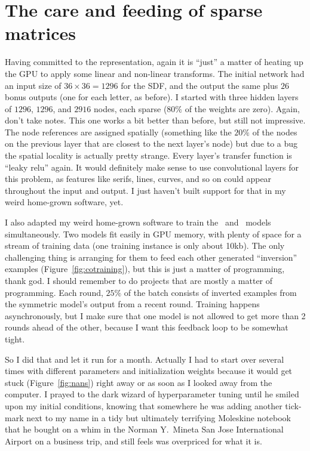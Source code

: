 \documentclass[twocolumn]{article}
\begin{document}
\section{The care and feeding of sparse matrices} \label{sec:neural}

Having committed to the representation, again it is ``just'' a matter
of heating up the GPU to apply some linear and non-linear transforms.
The initial network had an input size of $36 \times 36 = 1296$ for the
SDF, and the output the same plus $26$ bonus outputs (one for each
letter, as before). I started with three hidden layers of $1296$, $1296$,
and $2916$ nodes, each sparse ($80\%$ of the weights are zero). Again,
don't take notes. This one works a bit better than before, but still
not impressive. The node references are assigned spatially (something
like the $20\%$ of the nodes on the previous layer that are closest to
the next layer's node) but due to a bug the spatial locality is
actually pretty strange.
Every layer's transfer function is ``leaky relu'' again. It would
definitely make sense to use convolutional layers for this problem, as
features like serifs, lines, curves, and so on could appear throughout
the input and output. I just haven't built support for that in my
weird home-grown software, yet.

I also adapted my weird home-grown software to train the
\makeuppercase\ and \makelowercase\ models simultaneously. Two models
fit easily in GPU memory, with plenty of space for a stream of
training data (one training instance is only about 10kb). The only
challenging thing is arranging for them to feed each other generated
``inversion'' examples (Figure~\ref{fig:cotraining}), but this is just
a matter of programming, thank god. I should remember to do projects
that are mostly a matter of programming. Each round, $25\%$ of the
batch consists of inverted examples from the symmetric model's output
from a recent round. Training happens asynchronously, but I make sure
that one model is not allowed to get more than 2 rounds ahead of the
other, because I want this feedback loop to be somewhat tight.

So I did that and let it run for a month. Actually I had to start over
several times with different parameters and initialization weights
because it would get stuck (Figure~\ref{fig:nans}) right away or as
soon as I looked away from the computer. I prayed to the dark wizard
of hyperparameter tuning until he smiled upon my initial conditions,
knowing that somewhere he was adding another tick-mark next to my name
in a tidy but ultimately terrifying Moleskine notebook that he bought
on a whim in the Norman Y.~Mineta San Jose International Airport on a
business trip, and still feels was overpriced for what it is.
\end{document}
